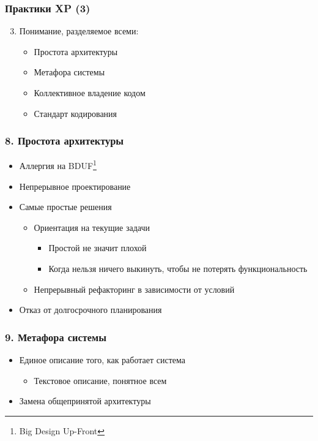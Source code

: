 \documentclass{../../slides-style}
\begin{document}
    \begin{frame}
        \frametitle{Практики XP (3)}
        \begin{enumerate}
            \setcounter{enumi}{2}
            \item Понимание, разделяемое всеми:
            \begin{itemize}
                \item Простота архитектуры
                \item Метафора системы
                \item Коллективное владение кодом
                \item Стандарт кодирования
            \end{itemize}
        \end{enumerate}
    \end{frame}

    \begin{frame}
        \frametitle{8. Простота архитектуры}
        \begin{itemize}
            \item Аллергия на BDUF\footnote{Big Design Up-Front}
            \item Непрерывное проектирование
            \item Самые простые решения
            \begin{itemize}
                \item Ориентация на текущие задачи
                \begin{itemize}
                    \item Простой не значит плохой
                    \item Когда нельзя ничего выкинуть, чтобы не потерять функциональность
                \end{itemize}
                \item Непрерывный рефакторинг в зависимости от условий
            \end{itemize}
            \item Отказ от долгосрочного планирования
        \end{itemize}
    \end{frame}

    \begin{frame}
        \frametitle{9. Метафора системы}
        \begin{itemize}
            \item Единое описание того, как работает система
            \begin{itemize}
                \item Текстовое описание, понятное всем
            \end{itemize}
            \item Замена общепринятой архитектуры
        \end{itemize}
    \end{frame}
\end{document}
